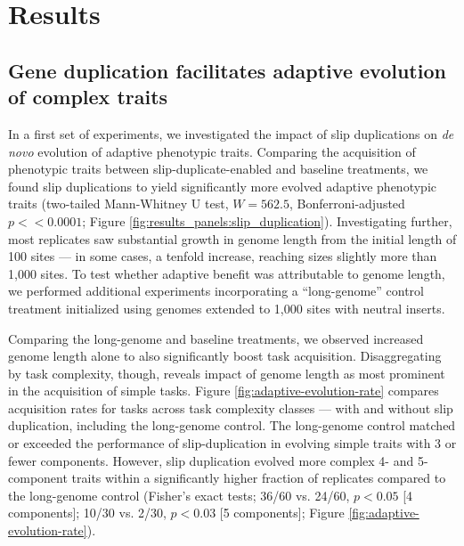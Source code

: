 \section{Results} \label{sec:results}

\subsection{Gene duplication facilitates adaptive evolution of complex traits}



In a first set of experiments, we investigated the impact of slip duplications on \textit{de novo} evolution of adaptive phenotypic traits.
Comparing the acquisition of phenotypic traits between slip-duplicate-enabled and baseline treatments, we found slip duplications to yield significantly more evolved adaptive phenotypic traits (two-tailed Mann-Whitney U test, $W = 562.5$, Bonferroni-adjusted $p << 0.0001$; Figure \ref{fig:results_panels:slip_duplication}).
Investigating further, most replicates saw substantial growth in genome length from the initial length of 100 sites --- in some cases, a tenfold increase, reaching sizes slightly more than 1,000 sites.
To test whether adaptive benefit was attributable to genome length, we performed additional experiments incorporating a ``long-genome'' control treatment initialized using genomes extended to 1,000 sites with neutral inserts.



Comparing the long-genome and baseline treatments, we observed increased genome length alone to also significantly boost task acquisition.
Disaggregating by task complexity, though, reveals impact of genome length as most prominent in the acquisition of simple tasks.
Figure \ref{fig:adaptive-evolution-rate} compares acquisition rates for tasks across task complexity classes --- with and without slip duplication, including the long-genome control.
The long-genome control matched or exceeded the performance of slip-duplication in evolving simple traits with 3 or fewer components.
However, slip duplication evolved more complex 4- and 5-component traits within a significantly higher fraction of replicates compared to the long-genome control (Fisher's exact tests; 36/60 vs. 24/60, $p<0.05$ [4 components]; 10/30 vs. 2/30, $p<0.03$ [5 components]; Figure \ref{fig:adaptive-evolution-rate}).

